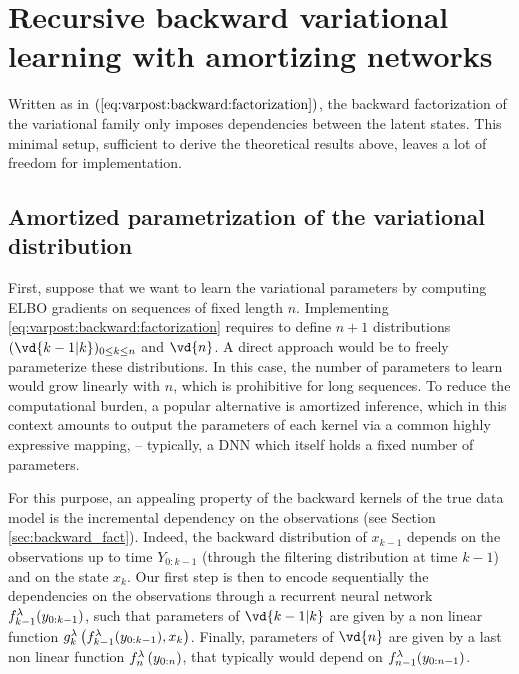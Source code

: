 \documentclass{article}
\begin{document}
\section{Recursive backward variational learning with amortizing networks} 
\label{sec:algorithm}
Written as in $(\ref{eq:varpost:backward:factorization})$, the backward factorization of the variational family only imposes dependencies between the latent states. 
This minimal setup, sufficient to derive the theoretical results above, leaves a lot of freedom for implementation. 

\subsection{Amortized parametrization of the variational distribution}

First, suppose that we want to learn the variational parameters by computing ELBO gradients on sequences of fixed length $n$. Implementing \eqref{eq:varpost:backward:factorization} requires to define $n + 1$ distributions $(\vd{k-1\vert k})_{0\leq k \leq n}$ and $\vd{n}$. 
A direct approach would be to freely parameterize these distributions.
In this case, the number of parameters to learn would grow linearly with $n$, which is prohibitive for long sequences. 
To reduce the computational burden, a popular alternative is amortized inference, which in this context amounts to output the parameters of each kernel via a common highly expressive mapping, -- typically, a DNN which itself holds a fixed number of parameters. 

For this purpose, an appealing property of the backward kernels of the true data model is the incremental dependency on the observations (see  Section \ref{sec:backward_fact}). 
Indeed, the backward distribution of $x_{k-1}$ depends on  the observations up to time $Y_{0:k-1}$ (through the filtering distribution at time $k-1$) and on the state $x_k$. 
Our first step is then to encode sequentially the dependencies on the  observations through a recurrent neural network $f_{k-1}^{\lambda}(y_{0:k-1})$, such that parameters of $\vd{k - 1\vert k}$ are given by a non linear function $g_k^\lambda\left(f_{k-1}^{\lambda}(y_{0:k-1}), x_k\right)$. 
Finally, parameters of $\vd{n}$ are given by a last non linear function $f_n^\lambda\left( y_{0:n}\right)$, that typically would depend on  $f_{n-1}^{\lambda}(y_{0:n-1})$.   
\end{document}
